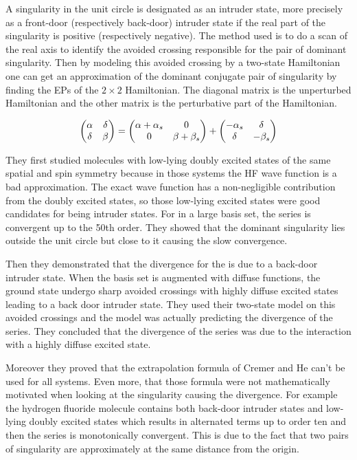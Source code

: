 \documentclass[11pt,a4paper]{article}
\begin{document}
{A singularity in the unit circle is designated as an intruder state, more precisely as a front-door (respectively back-door) intruder state if the real part of the singularity is positive (respectively negative). The method used is to do a scan of the real axis to identify the avoided crossing responsible for the pair of dominant singularity. Then by modeling this avoided crossing by a two-state Hamiltonian one can get an approximation of the dominant conjugate pair of singularity by finding the EPs of the $2\times2$ Hamiltonian. The diagonal matrix is the unperturbed Hamiltonian and the other matrix is the perturbative part of the Hamiltonian.

\begin{equation}
\mqty(\alpha & \delta \\ \delta & \beta) = \mqty(\alpha + \alpha_s & 0 \\ 0 & \beta + \beta_s ) + \mqty(- \alpha_s & \delta \\ \delta & - \beta_s)
\end{equation}
 
They first studied molecules with low-lying doubly excited states of the same spatial and spin symmetry because in those systems the HF wave function is a bad approximation. The exact wave function has a non-negligible contribution from the doubly excited states, so those low-lying excited states were good candidates for being intruder states. For  in a large basis set, the series is convergent up to the 50th order. They showed that the dominant singularity lies outside the unit circle but close to it causing the slow convergence.

Then they demonstrated that the divergence for the  is due to a back-door intruder state. When the basis set is augmented with diffuse functions, the ground state undergo sharp avoided crossings with highly diffuse excited states leading to a back door intruder state. They used their two-state model on this avoided crossings and the model was actually predicting the divergence of the series. They concluded that the divergence of the series was due to the interaction with a highly diffuse excited state. 

Moreover they proved that the extrapolation formula of Cremer and He \cite{Cremer_1996} can't be used for all systems. Even more, that those formula were not mathematically motivated when looking at the singularity causing the divergence. For example the hydrogen fluoride molecule contains both back-door intruder states and low-lying doubly excited states which results in alternated terms up to order ten and then the series is monotonically convergent. This is due to the fact that two pairs of singularity are approximately at the same distance from the origin.

}
\end{document}
